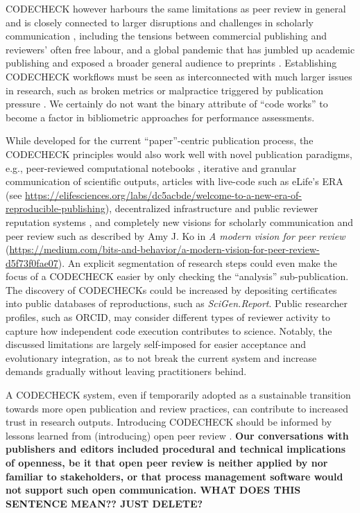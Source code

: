 \documentclass[12pt]{article}
\begin{document}
CODECHECK however harbours the same limitations as peer review in
general and is closely connected to larger disruptions and challenges
in scholarly communication
\cite{eglen_recent_2018,tennant_ten_2019,fyfe_mission_2019}, including
the tensions between commercial publishing and reviewers' often free
labour, and a global pandemic that has jumbled up academic
publishing and exposed a broader general audience to preprints
\cite{munafo_what_2020}.  Establishing CODECHECK
workflows must be seen as interconnected with much larger issues in
research, such as broken metrics or malpractice triggered by
publication pressure
\cite{piwowar_altmetrics:_2013,nosek_promoting_2015}.  We certainly do
not want the binary attribute of ``code works'' to become a factor in
bibliometric approaches for performance assessments.

While developed for the current ``paper''-centric publication process,
the CODECHECK principles would also work well with novel publication
paradigms, e.g., peer-reviewed computational notebooks
\cite{earthcube_new_2020}, iterative and granular communication of
scientific outputs, articles with live-code
\cite{perkel_pioneering_2019-1} such as eLife's ERA
(see \url{https://elifesciences.org/labs/dc5acbde/welcome-to-a-new-era-of-reproducible-publishing}),
decentralized infrastructure and public reviewer reputation systems
\cite{tenorio-fornes_towards_2019}, and completely new visions for
scholarly communication and peer review such as described by Amy J. Ko
in \emph{A modern vision for peer review}
(\url{https://medium.com/bits-and-behavior/a-modern-vision-for-peer-review-d5f73f0fae07}).
An explicit segmentation of research steps could even make the focus
of a CODECHECK easier by only checking the ``analysis''
sub-publication.  The discovery of CODECHECKs could be increased by
depositing certificates into public databases of reproductions, such as
\emph{SciGen.Report}.  Public researcher profiles, such as ORCID, may
consider different types of reviewer activity to capture how
independent code execution contributes to science.  Notably, the
discussed limitations are largely self-imposed for easier acceptance
and evolutionary integration, as to not break the current system and
increase demands gradually without leaving practitioners behind.

A CODECHECK system, even if temporarily adopted as a sustainable
transition towards more open publication and review practices, can
contribute to increased trust in research outputs. Introducing
CODECHECK should be informed by lessons learned from (introducing)
open peer review \cite{ross-hellauer_guidelines_2019}.  \textbf{Our
conversations with publishers and editors included procedural and
technical implications of openness, be it that open peer review is neither applied
by nor familiar to stakeholders, or that process management software
would not support such open communication. WHAT DOES THIS SENTENCE
MEAN??  JUST DELETE?}
\end{document}
